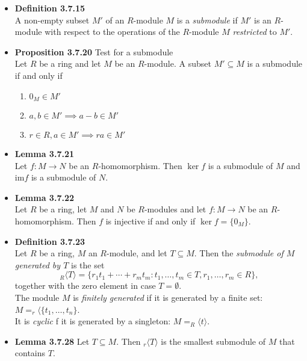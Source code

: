 \documentclass[11pt,a4paper]{article}
\begin{document}
\begin{itemize}
    \item \textbf{Definition 3.7.15} \\
        A non-empty subset $M'$ of an $R$-module $M$ is a \emph{submodule} if $M'$ is an
        $R$-module with respect to the operations of the $R$-module $M$ \emph{restricted} to
        $M'$.

    \item \textbf{Proposition 3.7.20} Test for a submodule \\
        Let $R$ be a ring and let $M$ be an $R$-module.
        A subset $M' \subseteq M$ is a submodule if and only if
        \begin{enumerate}
            \item $0_M \in M'$
            \item $a,b \in M' \implies a-b \in M'$
            \item $r \in R, a \in M' \implies ra \in M'$
        \end{enumerate}

    \item \textbf{Lemma 3.7.21} \\
        Let $f : M \to N$ be an $R$-homomorphism.
        Then $\ker f$ is a submodule of $M$ and $\mathrm{im} f$ is a submodule of $N$.

    \item \textbf{Lemma 3.7.22} \\
        Let $R$ be a ring, let $M$ and $N$ be $R$-modules and let $f : M \to N$ be an
        $R$-homomorphism.
        Then $f$ is injective if and only if $\ker f = \{0_M\}$.

    \item \textbf{Definition 3.7.23} \\
        Let $R$ be a ring, $M$ an $R$-module, and let $T \subseteq M$.
        Then the \emph{submodule of $M$ generated by $T$} is the set
        \[
            _R \langle T \rangle = \{{r_1}{t_1} + \cdots + {r_m}{t_m} : t_1, \ldots, t_m \in T,
            r_1, \ldots, r_m \in R \},
        \]
        together with the zero element in case $T = \emptyset$.\\
        The module $M$ is \emph{finitely generated} if it is generated by a finite set:
        $M = _r \langle \{ t_1, \ldots, t_n \}$. \\
        It is \emph{cyclic} f it is generated by a singleton:
        $M = _R \langle t \rangle$.

    \item \textbf{Lemma 3.7.28} Let $T \subseteq M$. Then $_r \langle T \rangle$
        is the smallest submodule of $M$ that contains $T$.


\end{itemize}
\end{document}
